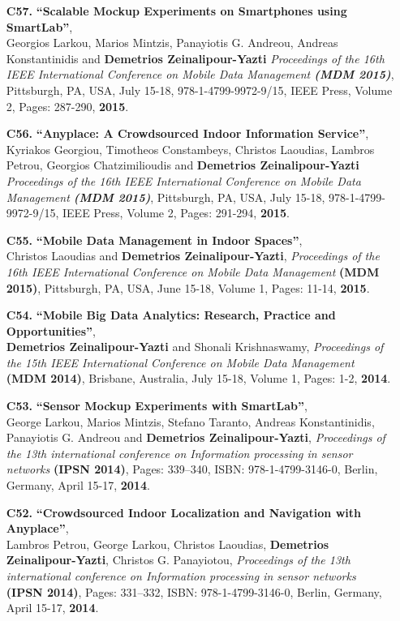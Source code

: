 \documentclass[10pt]{article}
\begin{document}
\begin{enumerate}
\item[{\bf C57.}]
\label{C57}
{\bf ``Scalable Mockup Experiments on Smartphones using SmartLab''}, \\
Georgios Larkou, Marios Mintzis, Panayiotis G. Andreou, Andreas Konstantinidis and {\bf Demetrios Zeinalipour-Yazti}
{\em Proceedings of the 16th IEEE International Conference on Mobile Data Management {\bf (MDM 2015)}},
Pittsburgh, PA, USA, July 15-18, 978-1-4799-9972-9/15, IEEE Press, Volume 2, Pages: 287-290, {\bf 2015}.

\item[{\bf C56.}]
\label{C56}
{\bf ``Anyplace: A Crowdsourced Indoor Information Service''}, \\
Kyriakos Georgiou, Timotheos Constambeys, Christos Laoudias, Lambros Petrou, Georgios Chatzimilioudis and  {\bf Demetrios Zeinalipour-Yazti}
{\em Proceedings of the 16th IEEE International Conference on Mobile Data Management {\bf (MDM 2015)}},
Pittsburgh, PA, USA, July 15-18, 978-1-4799-9972-9/15, IEEE Press, Volume 2, Pages: 291-294, {\bf 2015}.

\item[{\bf C55.}]
\label{C55}
{\bf ``Mobile Data Management in Indoor Spaces''}, \\
Christos Laoudias and {\bf Demetrios Zeinalipour-Yazti},
{\em Proceedings of the 16th IEEE International Conference on Mobile Data Management}
{\bf (MDM 2015)}, Pittsburgh, PA, USA, June 15-18, Volume 1, Pages: 11-14, {\bf 2015}.

\item[{\bf C54.}]
\label{C54}
{\bf ``Mobile Big Data Analytics: Research, Practice and Opportunities''}, \\
{\bf Demetrios Zeinalipour-Yazti} and Shonali Krishnaswamy,
{\em Proceedings of the 15th IEEE International Conference on Mobile Data Management}
{\bf (MDM 2014)}, Brisbane, Australia, July 15-18, Volume 1, Pages: 1-2, {\bf 2014}.

\item[{\bf C53.}]
\label{C53}
{\bf ``Sensor Mockup Experiments with SmartLab''}, \\
George Larkou, Marios Mintzis, Stefano Taranto, Andreas Konstantinidis, Panayiotis G. Andreou and {\bf Demetrios Zeinalipour-Yazti},
{\em Proceedings of the 13th international conference on Information processing in sensor networks}
{\bf (IPSN 2014)}, Pages: 339--340, ISBN: 978-1-4799-3146-0, Berlin, Germany, April 15-17, {\bf 2014}.

\item[{\bf C52.}]
\label{C52}
{\bf ``Crowdsourced Indoor Localization and Navigation with Anyplace''}, \\
Lambros Petrou, George Larkou, Christos Laoudias, {\bf Demetrios Zeinalipour-Yazti}, Christos G. Panayiotou,
{\em Proceedings of the 13th international conference on Information processing in sensor networks}
{\bf (IPSN 2014)}, Pages: 331--332, ISBN: 978-1-4799-3146-0, Berlin, Germany, April 15-17, {\bf 2014}.


\end{enumerate}
\end{document}
